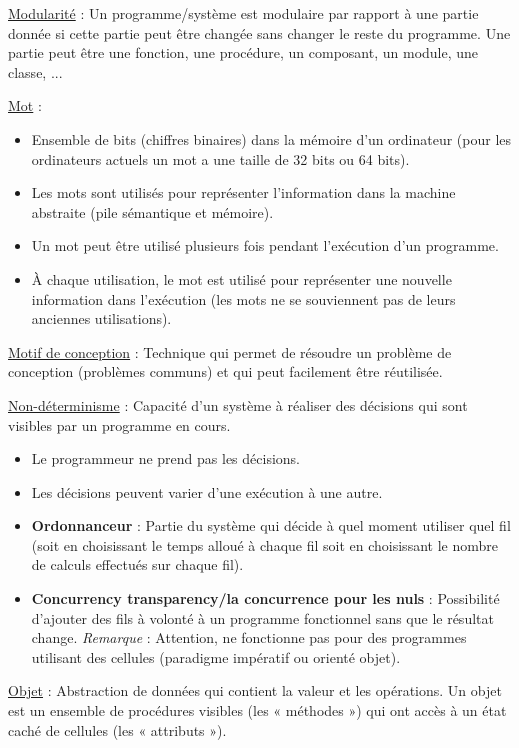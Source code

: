 \documentclass[fr,license=none,skiptoc]{../../../eplsummary}
\begin{document}
\begin{flushleft}
\textcolor{mauvedef}{\underline{Modularité}} : Un programme/système est modulaire par rapport à une partie donnée si cette partie peut être changée sans changer le reste du programme. Une partie peut être une fonction, une procédure, un composant, un module, une classe, ... \bigbreak


\textcolor{mauvedef}{\underline{Mot}} : 
\begin{itemize}
\item Ensemble de bits (chiffres binaires) dans la mémoire d’un ordinateur (pour les ordinateurs actuels un mot a une taille de 32 bits ou 64 bits).
\item Les mots sont utilisés pour représenter l’information dans la machine abstraite (pile sémantique et mémoire).
\item Un mot peut être utilisé plusieurs fois pendant l’exécution d’un programme.
\item À chaque utilisation, le mot est utilisé pour représenter une nouvelle information dans l’exécution (les mots ne se souviennent pas de leurs anciennes utilisations).
\end{itemize}
\bigbreak


\textcolor{mauvedef}{\underline{Motif de conception}} : Technique qui permet de résoudre un problème de conception (problèmes communs) et qui peut facilement être réutilisée.\bigbreak




\textcolor{mauvedef}{\underline{Non-déterminisme}} : Capacité d'un système à réaliser des décisions qui sont visibles par un programme en cours.
\begin{itemize}
\item Le programmeur ne prend pas les décisions.
\item Les décisions peuvent varier d'une exécution à une autre.
\item \textbf{Ordonnanceur} : Partie du système qui décide à quel moment utiliser quel fil (soit en choisissant le temps alloué à chaque fil soit en choisissant le nombre de calculs effectués sur chaque fil).
\item \textbf{Concurrency transparency/la concurrence pour les nuls} : Possibilité d'ajouter des fils à volonté à un programme fonctionnel sans que le résultat change. \textit{Remarque} : Attention, ne fonctionne pas pour des programmes utilisant des cellules (paradigme impératif ou orienté objet).
\end{itemize}
\bigbreak


\textcolor{mauvedef}{\underline{Objet}} : Abstraction de données qui contient la valeur et les opérations. Un objet est un ensemble de procédures visibles (les « méthodes ») qui ont accès à un état caché de cellules (les « attributs »). \bigbreak




\end{flushleft}
\end{document}
